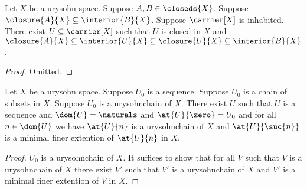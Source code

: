 \begin{theorem}\label{urysohnsetinbeetween}
    Let $X$ be a urysohn space.
    Suppose $A,B \in \closeds{X}$.
    Suppose $\closure{A}{X} \subseteq \interior{B}{X}$.
    Suppose $\carrier[X]$ is inhabited.
    There exist $U \subseteq \carrier[X]$ such that $U$ is closed in $X$ and $\closure{A}{X} \subseteq \interior{U}{X} \subseteq \closure{U}{X} \subseteq \interior{B}{X}$.
\end{theorem}
\begin{proof}
    Omitted.
\end{proof}


\begin{theorem}\label{induction_on_urysohnchains}
    Let $X$ be a urysohn space.
    Suppose $U_0$ is a sequence.
    Suppose $U_0$ is a chain of subsets in $X$.
    Suppose $U_0$ is a urysohnchain of $X$.
    There exist $U$ such that $U$ is a sequence and $\dom{U} = \naturals$ and $\at{U}{\zero} = U_0$ and for all $n \in \dom{U}$ we have $\at{U}{n}$ is a urysohnchain of $X$ and $\at{U}{\suc{n}}$ is a minimal finer extention of $\at{U}{n}$ in $X$.
\end{theorem}
\begin{proof}
    $U_0$ is a urysohnchain of $X$.
    It suffices to show that for all $V$ such that $V$ is a urysohnchain of $X$ there exist $V'$ such that $V'$ is a urysohnchain of $X$ and $V'$ is a minimal finer extention of $V$ in $X$.
    
\end{proof}





